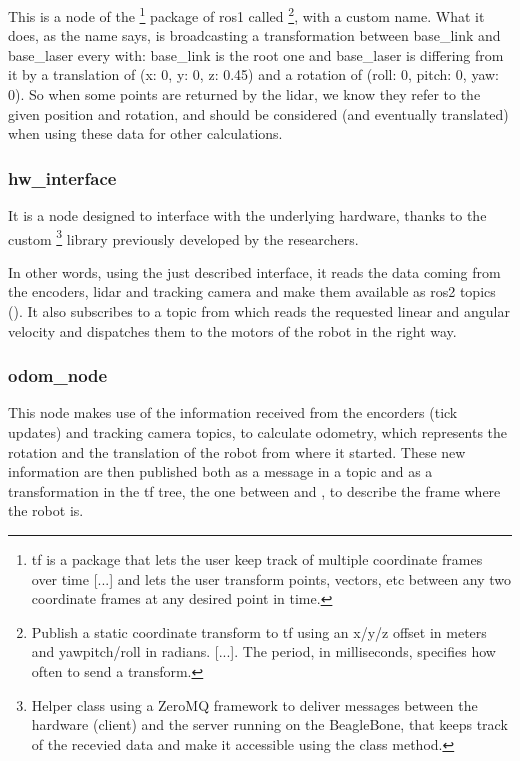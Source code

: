 This is a node of the \footnote{tf is a package that lets the user keep track of multiple coordinate frames over time [...] and lets the user transform points, vectors, etc between any two coordinate frames at any desired point in time.\cite{tf}} package of \acrshort{ros}1 called \footnote{Publish a static coordinate transform to tf using an x/y/z offset in meters and yaw\/pitch/roll in radians. [...]. The period, in milliseconds, specifies how often to send a transform.}, with a custom name. What it does, as the name says, is broadcasting a transformation between base\_link and base\_laser every  with: base\_link is the root one and base\_laser is differing from it by a translation of (x: 0, y: 0, z: 0.45) and a rotation of (roll: 0, pitch: 0, yaw: 0). So when some points are returned by the lidar, we know they refer to the given position and rotation, and should be considered (and eventually translated) when using these data for other calculations.

\subsubsection{hw\_interface}

It is a node designed to interface with the underlying hardware, thanks to the custom \footnote{Helper class using a ZeroMQ framework to deliver messages between the hardware (client) and the server running on the BeagleBone, that keeps track of the recevied data and make it accessible using the class method.} library previously developed by the researchers.

In other words, using the just described interface, it reads the data coming from the encoders, lidar and tracking camera and make them available as \acrshort{ros}2 topics (). It also subscribes to a  topic from which reads the requested linear and angular velocity and dispatches them to the motors of the robot in the right way.

\subsubsection{odom\_node}

This node makes use of the information received from the encorders (tick updates) and tracking camera topics, to calculate odometry, which represents the rotation and the translation of the robot from where it started. These new information are then published both as a message in a topic and as a transformation in the tf tree, the one between  and , to describe the frame where the robot is.